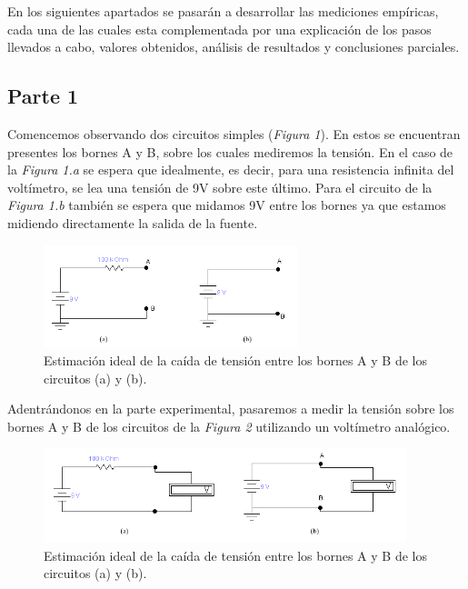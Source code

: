 \documentclass{article}
\begin{document}
	En los siguientes apartados se pasarán a desarrollar las mediciones empíricas, cada una de las cuales esta complementada por una explicación de los pasos llevados a cabo, valores obtenidos, análisis de resultados y conclusiones parciales.
\bigskip



\subsection{Parte 1}

	Comencemos observando dos circuitos simples (\textit{Figura 1}). En estos se encuentran presentes los bornes A y B, sobre los cuales mediremos la tensión. En el caso de la \textit{Figura 1.a} se espera que idealmente, es decir, para una resistencia infinita del voltímetro, se lea una tensión de 9V sobre este último. Para el circuito de la \textit{Figura 1.b} también se espera que midamos 9V entre los bornes ya que estamos midiendo directamente la salida de la fuente.
\bigskip

\begin{figure}[h]
	\centering
	\includegraphics[width=0.66\textwidth]{images/p1-item-1.jpg}
	\caption{Estimación ideal de la caída de tensión entre los bornes A y B de los circuitos (a) y (b).}
\end{figure}
\bigskip


	Adentrándonos en la parte experimental, pasaremos a medir la tensión sobre los bornes A y B de los circuitos de la \textit{Figura 2} utilizando un voltímetro analógico.
\bigskip

\begin{figure}[h]
	\centering
	\includegraphics[width=0.94\textwidth]{images/p1-item-2.jpg}
	\caption{Estimación ideal de la caída de tensión entre los bornes A y B de los circuitos (a) y (b).}
\end{figure}
\bigskip
\end{document}
